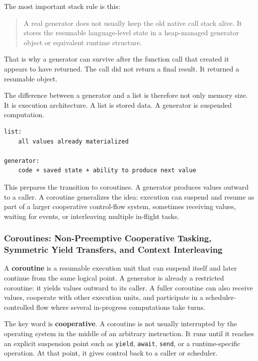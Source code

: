 The most important stack rule is this:

\begin{quote}
A real generator does not usually keep the old native call stack alive. It stores the resumable language-level state in a heap-managed generator object or equivalent runtime structure.
\end{quote}

That is why a generator can survive after the function call that created it appears to have returned. The call did not return a final result. It returned a resumable object.

The difference between a generator and a list is therefore not only memory size. It is execution architecture. A list is stored data. A generator is suspended computation.

\begin{verbatim}
list:
    all values already materialized

generator:
    code + saved state + ability to produce next value
\end{verbatim}

This prepares the transition to coroutines. A generator produces values outward to a caller. A coroutine generalizes the idea: execution can suspend and resume as part of a larger cooperative control-flow system, sometimes receiving values, waiting for events, or interleaving multiple in-flight tasks.



\subsubsection{Coroutines: Non-Preemptive Cooperative Tasking, Symmetric Yield Transfers, and Context Interleaving}

A \textbf{coroutine} is a resumable execution unit that can suspend itself and later continue from the same logical point. A generator is already a restricted coroutine: it yields values outward to its caller. A fuller coroutine can also receive values, cooperate with other execution units, and participate in a scheduler-controlled flow where several in-progress computations take turns.

The key word is \textbf{cooperative}. A coroutine is not usually interrupted by the operating system in the middle of an arbitrary instruction. It runs until it reaches an explicit suspension point such as \texttt{yield}, \texttt{await}, \texttt{send}, or a runtime-specific operation. At that point, it gives control back to a caller or scheduler.

